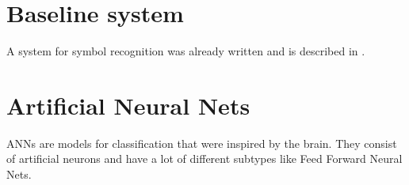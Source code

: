 
\chapter{Baseline system} %
\label{ch:Content1}


A system for symbol recognition was already written and is described in \cite{Kirsch}.



\chapter{Artificial Neural Nets}\label{ch:ANNs}

\Glspl{ANN} are models for classification that were inspired by the brain.
They consist of artificial neurons and have a lot of different subtypes like
Feed Forward Neural Nets.




